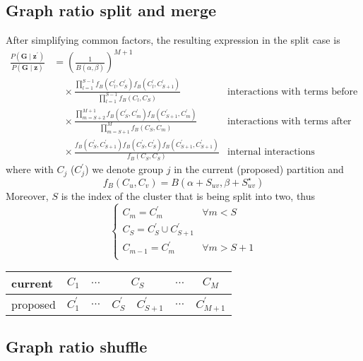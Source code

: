 \subsection{Graph ratio split and merge}\label{sec:graphratio}
After simplifying common factors, the resulting expression in the split case is %
\begin{align*}
    \frac{P(\bm{G} \mid \bm{z}^\prime)}{P(\bm{G} \mid \bm{z})}
    & =\left(\frac{1}{B(\alpha, \beta)}\right)^{M+1} &  \\
    & \quad \times \frac{\prod_{l=1}^{S-1} f_B(C_l^\prime, C_S^\prime) f_B(C_l^\prime, C_{S+1}^\prime)}{\prod_{l=1}^{S-1} f_B(C_l, C_S)} & \text{interactions with terms before}\\
    & \quad \times \frac{\prod_{m=S+2}^{M+1} f_B(C_S^\prime, C_m^\prime) f_B(C_{S+1}^\prime, C_m^\prime)}{\prod_{m=S+1}^M f_B(C_S, C_m)} & \text{interactions with terms after}\\
    & \quad \times \frac{f_B(C_S^\prime, C_{S+1}^\prime) f_B(C_S^\prime, C_S^\prime) f_B(C_{S+1}^\prime, C_{S+1}^\prime)}{f_B(C_S, C_S)} & \text{internal interactions}
\end{align*}
where with $C_{j}$ ($C_{j}^\prime$) we denote group $j$ in the current (proposed) partition and
\[
    f_B(C_u, C_v) = B(\alpha+S_{uv},\beta+S^{\star}_{uv})
\]
Moreover, $S$ is the index of the cluster that is being split into two, thus
\[
    \begin{cases}
        C_{m} = C_{m}^\prime & \forall m<S\\
        C_{S} = C_{S}^\prime \cup C_{S+1}^\prime &\\
        C_{m-1} = C_{m}^\prime & \forall m>S+1\\
    \end{cases}
\]

\begin{table}[H]
\centering
\begin{tabular}{l|c|c|c|c|c|c}
\toprule
current  & $C_1$ & $\ldots$ & \multicolumn{2}{c|}{$C_S$} & $\ldots$ & $C_M$    \\
\hline
proposed & $C_1^\prime$ & $\ldots$ & $C_S^\prime$       & $C_{S+1}^\prime$      & $\ldots$ & $C_{M+1}^\prime$\\
\bottomrule
\end{tabular}
\end{table}

\subsection{Graph ratio shuffle}\label{sec:graphratioshuffle}

